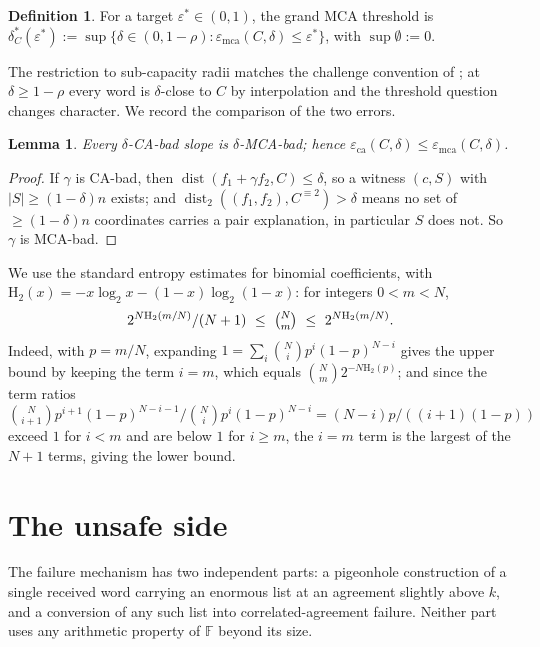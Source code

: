 \documentclass[11pt]{amsart}
\newtheorem{lemma}[lemma]{Lemma}
\theoremstyle{definition}
\newtheorem{definition}[definition]{Definition}
\theoremstyle{remark}
\newcommand{\F}{\mathbb{F}}
\newcommand{\dist}{\operatorname{dist}}
\newcommand{\eca}{\varepsilon_{\mathrm{ca}}}
\newcommand{\emca}{\varepsilon_{\mathrm{mca}}}
\newcommand{\Hb}{\mathrm{H}_2}
\begin{document}
\begin{definition}\label{def:dstar}
For a target $\varepsilon^*\in(0,1)$, the grand MCA threshold is
$\delta^*_C(\varepsilon^*):=\sup\{\delta\in(0,1-\rho):\emca(C,\delta)\le\varepsilon^*\}$, with $\sup\emptyset:=0$.
\end{definition}

The restriction to sub-capacity radii matches the challenge convention of \cite{ABF26,ProximityPrize}; at $\delta\ge1-\rho$ every word is $\delta$-close to $C$ by interpolation and the threshold question changes character. We record the comparison of the two errors.

\begin{lemma}\label{lem:chain}
Every $\delta$-CA-bad slope is $\delta$-MCA-bad; hence $\eca(C,\delta)\le\emca(C,\delta)$.
\end{lemma}

\begin{proof}
If $\gamma$ is CA-bad, then $\dist(f_1+\gamma f_2,C)\le\delta$, so a witness $(c,S)$ with $|S|\ge(1-\delta)n$ exists; and $\dist_2((f_1,f_2),C^{\equiv2})>\delta$ means no set of $\ge(1-\delta)n$ coordinates carries a pair explanation, in particular $S$ does not. So $\gamma$ is MCA-bad.
\end{proof}

We use the standard entropy estimates for binomial coefficients, with $\Hb(x)=-x\log_2x-(1-x)\log_2(1-x)$: for integers $0<m<N$,
\begin{equation}\label{eq:entropy}
2^{N\Hb(m/N)}/(N+1)\ \le\ \tbinom Nm\ \le\ 2^{N\Hb(m/N)}.
\end{equation}
Indeed, with $p=m/N$, expanding $1=\sum_i\binom Ni p^i(1-p)^{N-i}$ gives the upper bound by keeping the term $i=m$, which equals $\binom Nm2^{-N\Hb(p)}$; and since the term ratios $\binom N{i+1}p^{i+1}(1-p)^{N-i-1}/\binom Nip^i(1-p)^{N-i}=(N-i)p/((i+1)(1-p))$ exceed $1$ for $i<m$ and are below $1$ for $i\ge m$, the $i=m$ term is the largest of the $N+1$ terms, giving the lower bound.

\section{The unsafe side}\label{sec:unsafe}

The failure mechanism has two independent parts: a pigeonhole construction of a single received word carrying an enormous list at an agreement slightly above $k$, and a conversion of any such list into correlated-agreement failure. Neither part uses any arithmetic property of $\F$ beyond its size.
\end{document}
